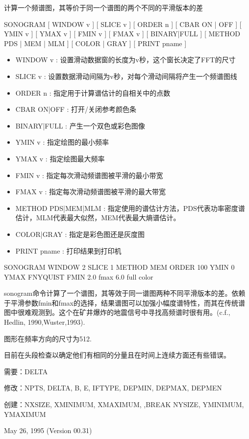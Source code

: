 \label{cmd:sonogram}

计算一个频谱图，其等价于同一个谱图的两个不同的平滑版本的差

SONOGRAM [ WINDOW v ] [ SLICE v ] [ ORDER n ] [ CBAR ON | OFF ] [ YMIN v ] [ YMAX v ] [ FMIN v ] [ FMAX v ] [ BINARY|FULL ] [ METHOD PDS | MEM | MLM ] [ COLOR | GRAY ] [ PRINT pname ]

\begin{itemize}
\item WINDOW v : 设置滑动数据窗的长度为v秒，这个窗长决定了FFT的尺寸 
\item SLICE v : 设置数据滑动间隔为v秒，对每个滑动间隔将产生一个频谱图线 
\item ORDER n : 指定用于计算谱估计的自相关中的点数 
\item CBAR {ON|OFF} : 打开/关闭参考颜色条 
\item BINARY|FULL : 产生一个双色或彩色图像 
\item YMIN v : 指定绘图的最小频率  
\item YMAX v : 指定绘图最大频率 
\item FMIN v : 指定每次滑动频谱图被平滑的最小带宽 
\item FMAX v : 指定每次滑动频谱图被平滑的最大带宽  
\item METHOD {PDS|MEM|MLM} : 指定使用的谱估计方法，PDS代表功率密度谱估计，MLM代表最大似然，MEM代表最大熵谱估计。 
\item COLOR|GRAY : 指定是彩色图还是灰度图 
\item PRINT pname : 打印结果到打印机 
\end{itemize}
 
SONOGRAM WINDOW 2 SLICE 1 METHOD MEM ORDER 100 YMIN 0 YMAX 	FNYQUIST FMIN 2.0 fmax 6.0 full color

sonogram命令计算了一个谱图，其等效于同一谱图两种不同平滑版本的差。依赖于平滑参数fmin和fmax的选择，结果谱图可以加强小幅度谱特性，而其在传统谱图中很难观测到。这个在矿井爆炸的地震信号中寻找高频谱时很有用。(c.f., Hedlin, 1990,Wuster,1993).

图形在频率方向的尺寸为512.

目前在头段检查以确定他们有相同的分量且在时间上连续方面还有些错误。

需要：DELTA

修改：NPTS, DELTA, B, E, IFTYPE, DEPMIN, DEPMAX, DEPMEN

创建：NXSIZE, XMINIMUM, XMAXIMUM, ,BREAK NYSIZE, YMINIMUM, YMAXIMUM

May 26, 1995 (Version 00.31)
